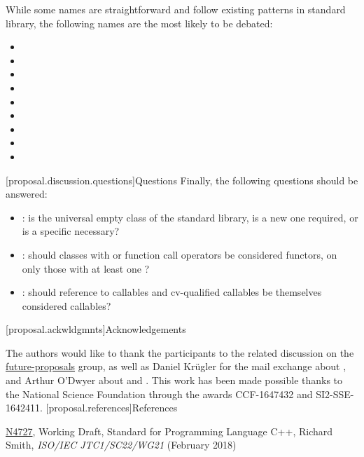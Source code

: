 \documentclass[ebook,10pt,oneside,openany,final]{memoir}
\begin{document}
While some names are straightforward and follow existing patterns in standard library, the following names are the most likely to be debated:
\begin{itemize}
\item {}
\item {}
\item {}
\item {}
\item {}
\item {}
\item {}
\item {}
\item {}
\end{itemize}
[proposal.discussion.questions]{Questions}
Finally, the following questions should be answered:
\begin{itemize}
\item {}: is  the universal empty class of the standard library, is a new one required, or is a specific  necessary?
\item {}: should classes with  or  function call operators be considered functors, on only those with at least one  ?
\item {}: should reference to callables and cv-qualified callables be themselves considered callables?
\end{itemize}
[proposal.ackwldgmnts]{Acknowledgements}

The authors would like to thank the participants to the related discussion on the \href{https://groups.google.com/a/isocpp.org/forum/#!topic/std-proposals/R04CWOjABIQ}{future-proposals} group, as well as Daniel Kr\"ugler for the mail exchange about , and Arthur O'Dwyer about  and . This work has been made possible thanks to the National Science Foundation through the awards CCF-1647432 and SI2-SSE-1642411.
[proposal.references]{References}

\href{http://www.open-std.org/jtc1/sc22/wg21/docs/papers/2018/n4727.pdf}{N4727}, Working Draft, Standard for Programming Language C++, Richard Smith, \emph{ISO/IEC JTC1/SC22/WG21} (February 2018)
\end{document}
